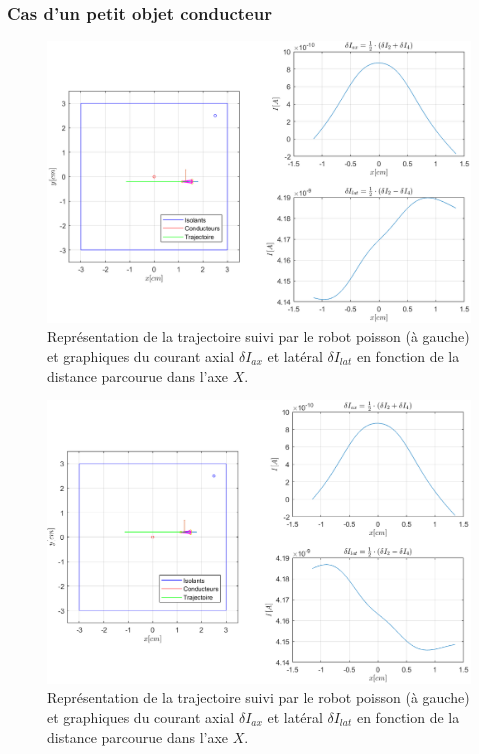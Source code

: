 \subsubsection{Cas d'un petit objet conducteur}
\begin{figure}[h!]
    \centering
    \includegraphics[width=\textwidth]{assets/plot_currents/Table1/conducteur_bas.png}
    \caption{Représentation de la trajectoire suivi par le robot poisson (à gauche) et graphiques du courant axial $\delta I_{ax}$ et latéral $\delta I_{lat}$ en fonction de la distance parcourue dans l'axe $X$.}
    \label{fig:conducteur_bas}
\end{figure}

\begin{figure}[h!]
    \centering
    \includegraphics[width=\textwidth]{assets/plot_currents/Table1/conducteur_haut.png}
    \caption{Représentation de la trajectoire suivi par le robot poisson (à gauche) et graphiques du courant axial $\delta I_{ax}$ et latéral $\delta I_{lat}$ en fonction de la distance parcourue dans l'axe $X$.}
    \label{fig:conducteur_haut}
\end{figure}
\clearpage
